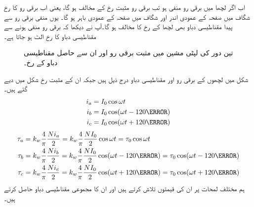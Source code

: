  اب اگر لچھا  میں برقی رو منفی ہو تب برقی رو مثبت رخ کے مخالف ہو گا، یعنی اب برقی رو کا رخ  شگاف   میں صفحہ کے عمودی  اندر  اور شگاف   میں  صفحہ کے عمودی  باہر ہو گا۔ یوں منفی برقی رو سے پیدا مقناطیسی دباو بھی لچھا  کے رخ کا  مخالف ہو گا۔آپ نے دیکھا کہ برقی رو منفی ہونے سے مقناطیسی دباو کا رخ الٹ ہو جاتا ہے۔
\begin{figure}
\centering
\caption{تین دور کی لپٹی مشین میں مثبت برقی رو اور ان سے حاصل مقناطیسی دباو کے رخ۔}
\label{شکل_گھومتے_مشین_تین_دوری}
\end{figure}
شکل  میں لچھوں کے برقی رو اور مقناطیسی دباو درج ذیل ہیں جبکہ ان کے مثبت رخ شکل میں دیے گئے ہیں۔
\begin{gather}
\begin{aligned}\label{مساوات_گھومتے_مشین_تین_دور_برقی_رو}
i_a&=I_0 \cos \omega t\\
i_b&=I_0 \cos (\omega t-120\degree)\\
i_c&=I_0 \cos (\omega t+120\degree)
\end{aligned}
\end{gather}
%
\begin{gather}
\begin{aligned}\label{مساوات_گھومتے_مشین_تین_دور_دباو}
\tau_a&=k_w \frac{4}{\pi}\frac{N i_a}{2}=k_w \frac{4}{\pi}\frac{N I_0}{2} \cos \omega t=\tau_0 \cos \omega t\\
\tau_b&=k_w \frac{4}{\pi}\frac{N i_b}{2}=k_w \frac{4}{\pi}\frac{N I_0}{2} \cos (\omega t-120\degree)=\tau_0 \cos (\omega t-120\degree)\\
\tau_c&=k_w \frac{4}{\pi}\frac{N i_c}{2}=k_w \frac{4}{\pi}\frac{N I_0}{2} \cos (\omega t+120\degree)=\tau_0 \cos (\omega t+120\degree)
\end{aligned}
\end{gather}
 ہم مختلف لمحات پر ان کی قیمتوں  تلاش کرتے ہیں اور ان کا مجموعی مقناطیسی دباو حاصل کرتے ہیں۔

